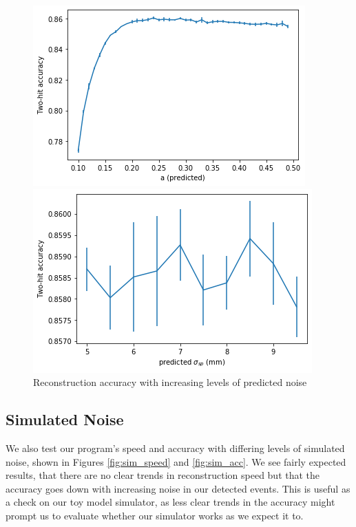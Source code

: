 \begin{figure}
        \centering
        \begin{minipage}{0.49\textwidth} \centering
        \includegraphics[width=\textwidth]{graphs/pi_enFactor_acc.png}
        \end{minipage}
        \begin{minipage}{0.49\textwidth} \centering
        \includegraphics[width=\textwidth]{graphs/pi_spFactor_acc.png}
        \end{minipage}
        \caption{Reconstruction accuracy with increasing levels of predicted noise}
        \label{fig:predicted_acc}
\end{figure}

\subsection*{Simulated Noise}
We also test our program's speed and accuracy with differing levels of simulated noise, shown in Figures \ref{fig:sim_speed} and \ref{fig:sim_acc}. We see fairly expected results, that there are no clear trends in reconstruction speed but that the accuracy goes down with increasing noise in our detected events. This is useful as a check on our toy model simulator, as less clear trends in the accuracy might prompt us to evaluate whether our simulator works as we expect it to.

